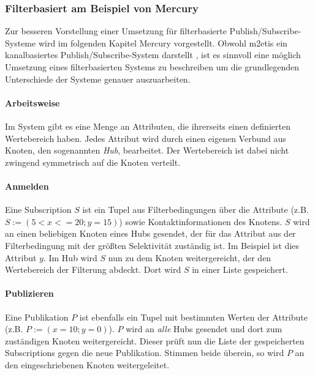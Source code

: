 \subsubsection{Filterbasiert am Beispiel von Mercury}
\label{chap:related:mercury}
Zur besseren Vorstellung einer Umsetzung für filterbasierte Publish/Subscribe-Systeme wird im folgenden Kapitel Mercury \cite{Bharambe2004Mercury} vorgestellt. Obwohl \ac{m2etis} ein kanalbasiertes Publish/Subscribe-System darstellt \cite{Fischer2010a}, ist es sinnvoll eine möglich Umsetzung eines filterbasierten Systems zu beschreiben um die grundlegenden Unterschiede der Systeme genauer auszuarbeiten. 

\paragraph*{Arbeitsweise}
Im System gibt es eine Menge an Attributen, die ihrerseits einen definierten Wertebereich haben. Jedes Attribut wird durch einen eigenen Verbund aus Knoten, den sogenannten \emph{Hub}, bearbeitet. Der Wertebereich ist dabei nicht zwingend symmetrisch auf die Knoten verteilt.

\paragraph*{Anmelden}
Eine Subscription $S$ ist ein Tupel aus Filterbedingungen über die Attribute (z.B. $S := (5 < x <= 20; y = 15)$) sowie Kontaktinformationen des Knotens. $S$ wird an einen beliebigen Knoten eines Hubs gesendet, der für das Attribut aus der Filterbedingung mit der größten Selektivität zuständig ist. Im Beispiel ist dies Attribut $y$. Im Hub wird $S$ nun zu dem Knoten weitergereicht, der den Wertebereich der Filterung abdeckt. Dort wird $S$ in einer Liste gespeichert.

\paragraph*{Publizieren}
Eine Publikation $P$ ist ebenfalls ein Tupel mit bestimmten Werten der Attribute (z.B. $P := (x = 10; y = 0)$). $P$ wird an \emph{alle} Hubs gesendet und dort zum zuständigen Knoten weitergereicht. Dieser prüft nun die Liste der gespeicherten Subscriptions gegen die neue Publikation. Stimmen beide überein, so wird $P$ an den eingeschriebenen Knoten weitergeleitet.


